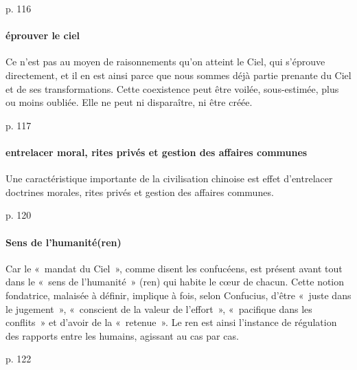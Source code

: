 \cite{PolDroit:voyage} p. 116 


\paragraph{éprouver le ciel} Ce n’est pas au moyen de raisonnements qu’on atteint le Ciel, qui s’éprouve directement, et il en est ainsi parce que nous sommes déjà partie prenante du Ciel et de ses transformations. Cette coexistence peut être voilée, sous-estimée, plus ou moins oubliée. Elle ne peut ni disparaître, ni être créée.

\cite{PolDroit:voyage} p. 117 


\paragraph{entrelacer moral, rites privés et gestion des affaires communes} Une caractéristique importante de la civilisation chinoise est effet d’entrelacer doctrines morales, rites privés et gestion des affaires communes.

\cite{PolDroit:voyage} p. 120 

\paragraph{Sens de l'humanité(ren)}
Car le « mandat du Ciel », comme disent les confucéens, est présent avant tout dans le « sens de l’humanité » (ren) qui habite le cœur de chacun. Cette notion fondatrice, malaisée à définir, implique à fois, selon Confucius, d’être « juste dans le jugement », « conscient de la valeur de l’effort », « pacifique dans les conflits » et d’avoir de la « retenue ». Le ren est ainsi l’instance de régulation des rapports entre les humains, agissant au cas par cas.

\cite{PolDroit:voyage} p. 122 

